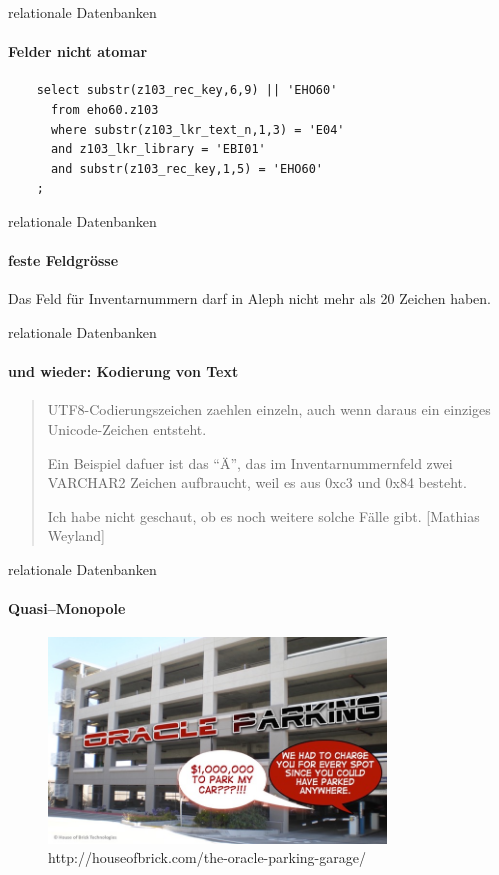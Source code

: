 \begin{frame}[fragile]{relationale Datenbanken}
\framesubtitle{Felder nicht atomar}
  \begin{lstlisting}
    select substr(z103_rec_key,6,9) || 'EHO60'
      from eho60.z103
      where substr(z103_lkr_text_n,1,3) = 'E04'
      and z103_lkr_library = 'EBI01'
      and substr(z103_rec_key,1,5) = 'EHO60'
    ;
  \end{lstlisting}
\end{frame}
        

\begin{frame}{relationale Datenbanken}
\framesubtitle{feste Feldgrösse}
  Das Feld für Inventarnummern darf in Aleph nicht mehr als 20 Zeichen haben. 
\end{frame}
%
\begin{frame}{relationale Datenbanken}
\framesubtitle{und wieder: Kodierung von Text}
  \begin{quote}
    UTF8-Codierungszeichen zaehlen einzeln, auch wenn daraus ein einziges Unicode-Zeichen entsteht. 

    Ein Beispiel dafuer ist das ``Ä'', das im Inventarnummernfeld zwei VARCHAR2 Zeichen aufbraucht, weil es aus 0xc3 und 0x84 besteht. 

    Ich habe nicht geschaut, ob es noch weitere solche Fälle gibt. \hfill{[Mathias Weyland]}
  \end{quote}
\end{frame}
%
\begin{frame}{relationale Datenbanken}
\framesubtitle{Quasi--Monopole}
  \begin{figure}
    \begin{center}
      \includegraphics[width=0.8\textwidth]{pics/Oracle-Parking}
      \end{center}
      \caption{http://houseofbrick.com/the-oracle-parking-garage/}
    \end{figure}
\end{frame}
%
